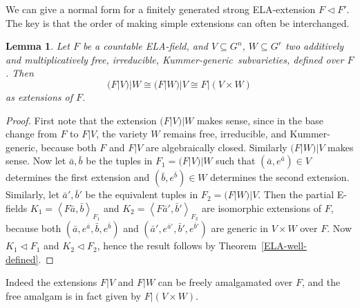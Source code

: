 \documentclass[12pt]{amsart}
\newtheorem{lemma}[prop]{Lemma}
\theoremstyle{definition}
\begin{document}
We can give a normal form for a finitely generated strong ELA-extension $F {\ensuremath{\lhd}} F'$. The key is that the order of making simple extensions can often be interchanged.
\begin{lemma}\label{order of extensions}
  Let $F$ be a countable ELA-field, and $V {\subseteq} G^n$, $W {\subseteq} G^r$ two additively and multiplicatively free, irreducible, {Kummer-generic}\ subvarieties, defined over $F$. Then 
  \[(F|V)|W {\cong} (F|W)|V {\cong} F|(V{\ensuremath{\times}} W)\]
   as extensions of $F$.
\end{lemma}
\begin{proof}
First note that the extension $(F|V)|W$ makes sense, since in the base change from $F$ to $F|V$, the variety $W$ remains free, irreducible, and Kummer-generic, because both $F$ and $F|V$ are algebraically closed. Similarly $(F|W)|V$ makes sense.
  Now let ${{\ensuremath{\bar{a}}}}, {{\ensuremath{\bar{b}}}}$ be the tuples in $F_1 = (F|V)|W$ such that $({{\ensuremath{\bar{a}}}},e^{{\ensuremath{\bar{a}}}}) \in V$ determines the first extension and $({{\ensuremath{\bar{b}}}},e^{{\ensuremath{\bar{b}}}}) \in W$ determines the second extension. Similarly, let ${{\ensuremath{\bar{a}}}}',{{\ensuremath{\bar{b}}}}'$ be the equivalent tuples in $F_2 = (F|W)|V$. Then the partial E-fields $K_1 = {\ensuremath{\left\langle {F{{\ensuremath{\bar{a}}}},{{\ensuremath{\bar{b}}}}} \right\rangle}}_{F_1}$ and $K_2 = {\ensuremath{\left\langle {F{{\ensuremath{\bar{a}}}}',{{\ensuremath{\bar{b}}}}'} \right\rangle}}_{F_2}$ are isomorphic extensions of $F$, because both $({{\ensuremath{\bar{a}}}},e^{{\ensuremath{\bar{a}}}},{{\ensuremath{\bar{b}}}},e^{{\ensuremath{\bar{b}}}})$ and $({{\ensuremath{\bar{a}}}}',e^{{{\ensuremath{\bar{a}}}}'},{{\ensuremath{\bar{b}}}}',e^{{{\ensuremath{\bar{b}}}}'})$ are generic in $V {\ensuremath{\times}} W$ over $F$. Now $K_1 {\ensuremath{\lhd}} F_1$ and $K_2 {\ensuremath{\lhd}} F_2$, hence the result follows by Theorem~\ref{ELA-well-defined}.
\end{proof}
Indeed the extensions $F|V$ and $F|W$ can be freely amalgamated over $F$, and the free amalgam is in fact given by $F|(V{\ensuremath{\times}} W)$.
\end{document}
